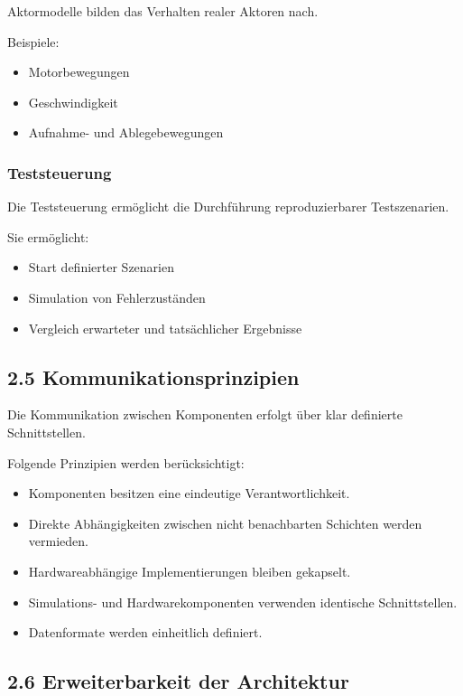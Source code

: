 \documentclass[
]{article}
\providecommand{\tightlist}{%
  \setlength{\itemsep}{0pt}\setlength{\parskip}{0pt}}
\begin{document}
Aktormodelle bilden das Verhalten realer Aktoren nach.

Beispiele:

\begin{itemize}
\tightlist
\item
  Motorbewegungen
\item
  Geschwindigkeit
\item
  Aufnahme- und Ablegebewegungen
\end{itemize}

\subsubsection{Teststeuerung}\label{teststeuerung}

Die Teststeuerung ermöglicht die Durchführung reproduzierbarer
Testszenarien.

Sie ermöglicht:

\begin{itemize}
\tightlist
\item
  Start definierter Szenarien
\item
  Simulation von Fehlerzuständen
\item
  Vergleich erwarteter und tatsächlicher Ergebnisse
\end{itemize}

\subsection{2.5
Kommunikationsprinzipien}\label{kommunikationsprinzipien}

Die Kommunikation zwischen Komponenten erfolgt über klar definierte
Schnittstellen.

Folgende Prinzipien werden berücksichtigt:

\begin{itemize}
\tightlist
\item
  Komponenten besitzen eine eindeutige Verantwortlichkeit.
\item
  Direkte Abhängigkeiten zwischen nicht benachbarten Schichten werden
  vermieden.
\item
  Hardwareabhängige Implementierungen bleiben gekapselt.
\item
  Simulations- und Hardwarekomponenten verwenden identische
  Schnittstellen.
\item
  Datenformate werden einheitlich definiert.
\end{itemize}

\subsection{2.6 Erweiterbarkeit der
Architektur}\label{erweiterbarkeit-der-architektur}
\end{document}

